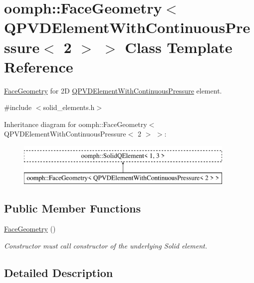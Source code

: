 \hypertarget{classoomph_1_1FaceGeometry_3_01QPVDElementWithContinuousPressure_3_012_01_4_01_4}{}\section{oomph\+:\+:Face\+Geometry$<$ Q\+P\+V\+D\+Element\+With\+Continuous\+Pressure$<$ 2 $>$ $>$ Class Template Reference}
\label{classoomph_1_1FaceGeometry_3_01QPVDElementWithContinuousPressure_3_012_01_4_01_4}


\hyperlink{classoomph_1_1FaceGeometry}{Face\+Geometry} for 2D \hyperlink{classoomph_1_1QPVDElementWithContinuousPressure}{Q\+P\+V\+D\+Element\+With\+Continuous\+Pressure} element.  




{\ttfamily \#include $<$solid\+\_\+elements.\+h$>$}

Inheritance diagram for oomph\+:\+:Face\+Geometry$<$ Q\+P\+V\+D\+Element\+With\+Continuous\+Pressure$<$ 2 $>$ $>$\+:\begin{figure}[H]
\begin{center}
\leavevmode
\includegraphics[height=2.000000cm]{classoomph_1_1FaceGeometry_3_01QPVDElementWithContinuousPressure_3_012_01_4_01_4}
\end{center}
\end{figure}
\subsection*{Public Member Functions}
\begin{DoxyCompactItemize}
\item 
\hyperlink{classoomph_1_1FaceGeometry_3_01QPVDElementWithContinuousPressure_3_012_01_4_01_4_ac153b3a13943b0c907d4228d11fdf00d}{Face\+Geometry} ()
\begin{DoxyCompactList}\small\item\em Constructor must call constructor of the underlying Solid element. \end{DoxyCompactList}\end{DoxyCompactItemize}


\subsection{Detailed Description}
